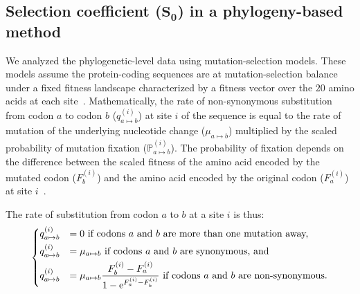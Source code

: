 \documentclass[10pt,letterpaper]{article}
\newcommand{\e}{\text{e}}
\newcommand{\proba}{\mathbb{P}}
\newcommand{\Sphy}{S_{0}}
\begin{document}
\subsection{Selection coefficient (\texorpdfstring{$\bm{\Sphy}$}{S₀}) in a phylogeny-based method}
\label{subsec:s-phylogeny-method}

We analyzed the phylogenetic-level data using mutation-selection models.
These models assume the protein-coding sequences are at mutation-selection balance under a fixed fitness landscape characterized by a fitness vector over the $20$ amino acids at each site~\cite{yang_mutationselection_2008, halpern_evolutionary_1998, rodrigue_mechanistic_2010}.
Mathematically, the rate of non-synonymous substitution from codon $a$ to codon $b$ ($q_{a \mapsto b}^{(i)}$) at site $i$ of the sequence is equal to the rate of mutation of the underlying nucleotide change ($\mu_{a \mapsto b}$) multiplied by the scaled probability of mutation fixation ($\proba_{a \mapsto b}^{(i)}$).
The probability of fixation depends on the difference between the scaled fitness of the amino acid encoded by the mutated codon ($F_b^{(i)}$) and the amino acid encoded by the original codon ($F_a^{(i)}$) at site $i$~\cite{wright_evolution_1931, fisher_genetical_1930}.

The rate of substitution from codon $a$ to $b$ at a site $i$ is thus:
\begin{equation}
\begin{dcases}
q_{a \mapsto b}^{(i)} & = 0 \text{ if codons $a$ and $b$ are more than one mutation away,} \\
q_{a \mapsto b}^{(i)} & = \mu_{a \mapsto b} \text{ if codons $a$ and $b$ are synonymous, and}\\
q_{a \mapsto b}^{(i)} & = \mu_{a \mapsto b} \dfrac{F_b^{(i)} - F_a^{(i)}}{1 - \e^{F_a^{(i)} - F_b^{(i)}}} \text{ if codons $a$ and $b$ are non-synonymous}.
\end{dcases}
\end{equation}
\end{document}
